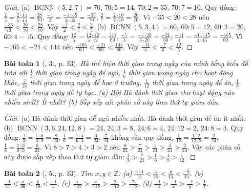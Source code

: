 \documentclass{article}
\newtheorem{baitoan}{Bài toán}
\begin{document}
\begin{proof}[Giải]
	(a) $\operatorname{BCNN}(5,2,7) = 70$, $70:5 = 14$, $70:2 = 35$, $70:7 = 10$. Quy đồng: $\frac{2}{5} = \frac{2\cdot14}{5\cdot14} = \frac{28}{70}$, $\frac{-1}{2} = \frac{-1\cdot35}{2\cdot35} = \frac{-35}{70}$, $\frac{2}{7} = \frac{2\cdot10}{7\cdot10} = \frac{20}{70}$. Vì $-35 < 20 < 28$ nên $\frac{-35}{70} < \frac{20}{70} < \frac{28}{70}$. Vậy $\frac{-1}{2} < \frac{2}{7} < \frac{2}{5}$. (b) $\operatorname{BCNN}(5,3,4) = 60$, $60:5 = 12$, $60:3 = 20$, $60:4 = 15$. Quy đồng: $\frac{12}{5} = \frac{12\cdot12}{5\cdot12} = \frac{144}{60}$, $\frac{-7}{3} = \frac{-7\cdot20}{3\cdot20} = \frac{-21}{60}$, $\frac{-11}{4} = \frac{-11\cdot15}{4\cdot15} = \frac{-165}{60}$. Vì $-165 < -21 < 144$ nên $\frac{-165}{60} < \frac{-21}{60} < \frac{144}{60}$. Vậy $\frac{-11}{4} < \frac{-7}{3} < \frac{12}{5}$.
\end{proof}

\begin{baitoan}[\cite{SGK_Toan_6_Canh_Dieu_tap_2}, 3., p. 33]
	Hà thể hiện thời gian trong ngày của mình bằng biểu đồ tròn với $\frac{1}{3}$ thời gian trong ngày để ngủ, $\frac{1}{6}$ thời gian trong ngày cho hoạt động khác, $\frac{7}{24}$ thời gian trong ngày để học ở trường, $\frac{1}{12}$ thời gian trong ngày để ăn, $\frac{1}{8}$ thời gian trong ngày để tự học. (a) Hỏi Hà dành thời gian cho hoạt động nào nhiều nhất? Ít nhất? (b) Sắp xếp các phân số này theo thứ tự giảm dần.
\end{baitoan}

\begin{proof}[Giải]
	(a) Hà dành thời gian để ngủ nhiều nhất. Hà dành thời gian để ăn ít nhất. (b) $\operatorname{BCNN}(3,6,24,12,8) = 24$, $24:3 = 8$, $24:6 = 4$, $24:12 = 2$, $24:8 = 3$. Quy đồng: $\frac{1}{3} = \frac{1\cdot8}{3\cdot8} = \frac{8}{24}$, $\frac{1}{6} = \frac{1\cdot4}{6\cdot4} = \frac{4}{24}$, $\frac{7}{24}$ không cần quy đồng, $\frac{1}{12} = \frac{1\cdot2}{12\cdot2} = \frac{2}{24}$, $\frac{1}{8} = \frac{1\cdot3}{8\cdot3} = \frac{3}{24}$. Vì $8 > 7 > 4 > 3 > 2$ nên $\frac{8}{24} > \frac{7}{24} > \frac{4}{24} > \frac{3}{24} > \frac{2}{24}$. Vậy các phân số này được sắp xếp theo thứ tự giảm dần: $\frac{1}{3} > \frac{7}{24} > \frac{1}{6} > \frac{1}{8} > \frac{1}{12}$.
\end{proof}

\begin{baitoan}[\cite{SGK_Toan_6_Canh_Dieu_tap_2}, 5., p. 33]
	Tìm $x,y\in\mathbb{Z}$: (a) $\frac{-11}{15} < \frac{x}{15} < \frac{y}{15} < \frac{-8}{15}$. (b) $\frac{-1}{3} < \frac{x}{36} < \frac{y}{18} < \frac{-1}{4}$. (c) $\frac{4}{-12} > \frac{x}{-12} > \frac{y}{-12} > \frac{7}{-12}$. (d) $\frac{-1}{-4} > \frac{-1}{x} > \frac{-1}{y} > \frac{1}{7}$.
\end{baitoan}
\end{document}
